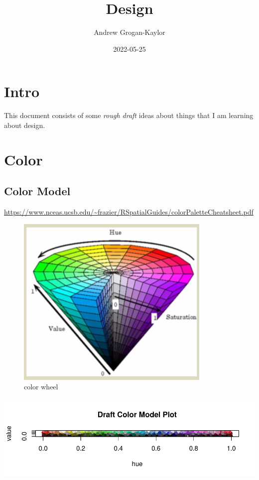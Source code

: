\documentclass[
]{article}
\title{Design}
\author{Andrew Grogan-Kaylor}
\date{2022-05-25}
\begin{document}
\maketitle

{
\setcounter{tocdepth}{2}
\tableofcontents
}
\hypertarget{intro}{%
\section{Intro}\label{intro}}

This document consists of some \emph{rough draft} ideas about things
that I am learning about design.

\hypertarget{color}{%
\section{Color}\label{color}}

\hypertarget{color-model}{%
\subsection{Color Model}\label{color-model}}

\url{https://www.nceas.ucsb.edu/~frazier/RSpatialGuides/colorPaletteCheatsheet.pdf}

\begin{figure}
\centering
\includegraphics{colorwheel.png}
\caption{color wheel}
\end{figure}

\includegraphics{design_files/figure-latex/unnamed-chunk-1-1.pdf}
\end{document}
